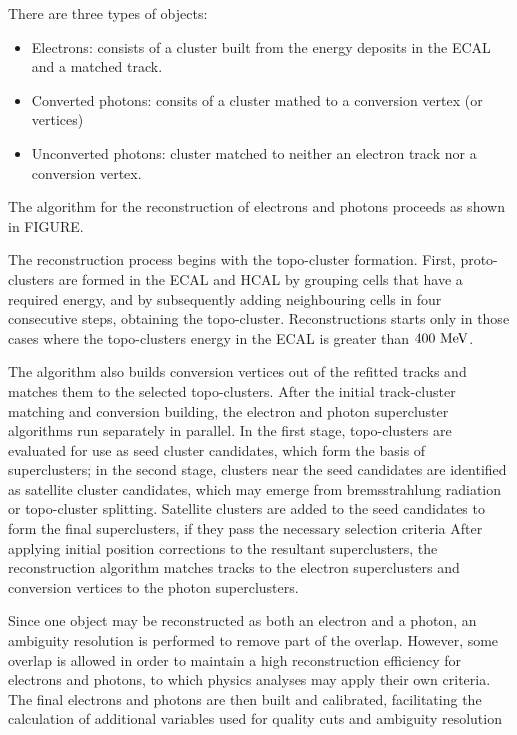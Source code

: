 There are three types of objects:
\begin{itemize}
    \item Electrons: consists of a cluster built from the energy deposits in the \ac{ECAL} and a matched track.
    \item Converted photons: consits of a cluster mathed to a conversion vertex (or vertices)
    \item Unconverted photons: cluster matched to neither an electron track nor a conversion vertex.
\end{itemize}
The algorithm for the reconstruction of electrons and photons proceeds as shown in FIGURE.

The reconstruction process begins with the topo-cluster formation. First, proto-clusters are formed in the \ac{ECAL} and \ac{HCAL} by grouping cells that have a required energy, and by subsequently adding neighbouring cells in four consecutive steps, obtaining the topo-cluster. Reconstructions starts only in those cases where the topo-clusters energy in the \ac{ECAL} is greater than \(400~\text{MeV}\).

The algorithm also builds conversion vertices out of the refitted tracks and matches them to the selected topo-clusters.
After the initial track-cluster matching and conversion building, the electron and photon supercluster algorithms run separately in parallel. In the first stage, topo-clusters are evaluated for use as seed cluster candidates, which form the basis of superclusters; in the second stage, clusters near the seed candidates are identified as satellite cluster candidates, which may emerge from bremsstrahlung radiation or topo-cluster splitting. Satellite clusters are added to the seed candidates to form the final superclusters, if they pass the necessary selection criteria
After applying initial position corrections to the resultant superclusters, the reconstruction algorithm matches tracks to
the electron superclusters and conversion vertices to the photon superclusters.

Since one object may be reconstructed as both an electron and a photon, an ambiguity resolution is performed to remove part of the overlap. However, some overlap is allowed in order to maintain a high reconstruction efficiency for electrons and photons, to which physics analyses may apply their own criteria. The final electrons and photons are then built and calibrated, facilitating the calculation of additional variables used for quality cuts and ambiguity resolution



